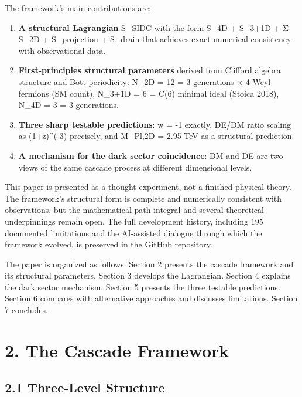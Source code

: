 The framework's main contributions are:

\begin{enumerate}
\def\labelenumi{\arabic{enumi}.}
\item
  \textbf{A structural Lagrangian} S\_SIDC with the form S\_4D + S\_3+1D
  + Σ S\_2D + S\_projection + S\_drain that achieves exact numerical
  consistency with observational data.
\item
  \textbf{First-principles structural parameters} derived from Clifford
  algebra structure and Bott periodicity: N\_2D = 12 = 3 generations × 4
  Weyl fermions (SM count), N\_3+1D = 6 = C(6) minimal ideal (Stoica
  2018), N\_4D = 3 = 3 generations.
\item
  \textbf{Three sharp testable predictions}: w = -1 exactly, DE/DM ratio
  scaling as (1+z)\^{}(-3) precisely, and M\_Pl,2D = 2.95 TeV as a
  structural prediction.
\item
  \textbf{A mechanism for the dark sector coincidence}: DM and DE are
  two views of the same cascade process at different dimensional levels.
\end{enumerate}

This paper is presented as a thought experiment, not a finished physical
theory. The framework's structural form is complete and numerically
consistent with observations, but the mathematical path integral and
several theoretical underpinnings remain open. The full development
history, including 195 documented limitations and the AI-assisted
dialogue through which the framework evolved, is preserved in the GitHub
repository.

The paper is organized as follows. Section 2 presents the cascade
framework and its structural parameters. Section 3 develops the
Lagrangian. Section 4 explains the dark sector mechanism. Section 5
presents the three testable predictions. Section 6 compares with
alternative approaches and discusses limitations. Section 7 concludes.

\hypertarget{the-cascade-framework}{%
\section{2. The Cascade Framework}\label{the-cascade-framework}}

\hypertarget{three-level-structure}{%
\subsection{2.1 Three-Level Structure}\label{three-level-structure}}

